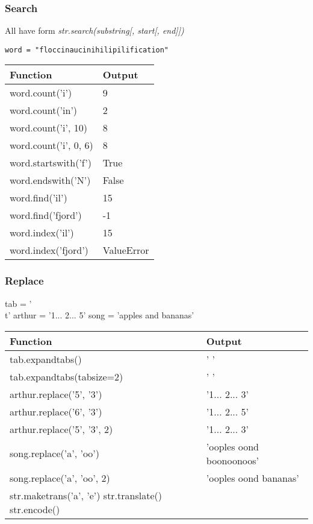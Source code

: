 \documentclass{beamer}
\begin{document}
%
%
\begin{frame}
  \frametitle{Search}
  All have form \textit{str.search(substring[, start[, end]])}
  
  \lstinline{word = "floccinaucinihilipilification"}

  \begin{table}
    \begin{tabular}{l | l}
    Function & Output \\
    \hline
    word.count('i') & 9 \\
    word.count('in') & 2 \\
    word.count('i', 10) & 8 \\
    word.count('i', 0, 6) & 8 \\
    \hline
    word.startswith('f') & True \\
    word.endswith('N') & False \\
    \hline
    word.find('il') & 15 \\
    word.find('fjord') & -1 \\
    \hline
    word.index('il') & 15 \\
    word.index('fjord') & ValueError
   \end{tabular}
  \end{table}
\end{frame}


%
%
\begin{frame}
  \frametitle{Replace}
  tab = '\\t'
  arthur = '1... 2... 5'
  song = 'apples and bananas'
  \begin{table}
    \begin{tabular}{l | l}
    Function & Output \\
    \hline
    tab.expandtabs() & '        ' \\
    tab.expandtabs(tabsize=2) & '  ' \\
    \hline
    arthur.replace('5', '3') & '1... 2... 3'\\
    arthur.replace('6', '3') & '1... 2... 5'\\
    arthur.replace('5', '3', 2) & '1... 2... 3'\\
    song.replace('a', 'oo') & 'ooples oond boonoonoos'\\
    song.replace('a', 'oo', 2) & 'ooples oond bananas'\\
    \hline
    str.maketrans('a', 'e') 
    str.translate()
    \hline
    str.encode()
   \end{tabular}
  \end{table}
\end{frame}
\end{document}
